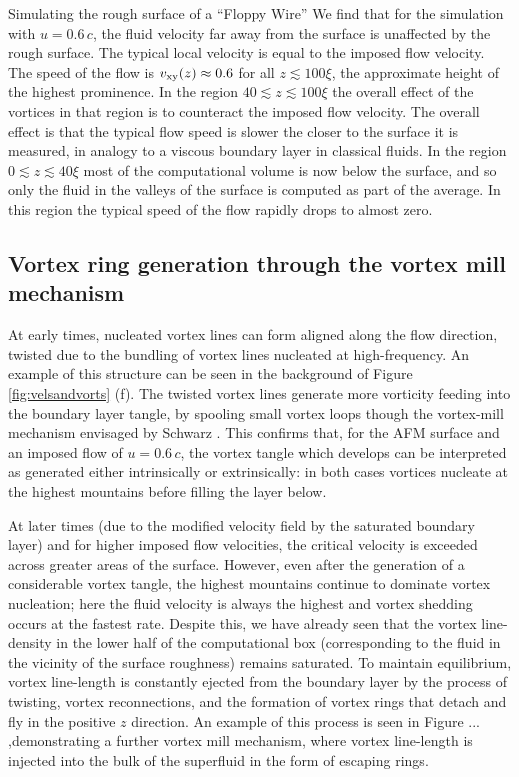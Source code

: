 \begin{chapter}{\label{cha:afm}Simulating the rough surface of a ``Floppy Wire''}
We find that for the simulation with $u=0.6\,c$, the fluid velocity far away from the surface is unaffected by the rough surface. The typical local velocity is equal to the imposed flow velocity. The speed of the flow is $v_{\rm xy}(z)\approx0.6$ for all $z \lesssim 100\xi$, the approximate height of the highest prominence. In the region $40 \lesssim z \lesssim 100\xi$ the overall effect of the vortices in that region is to counteract the imposed flow velocity. The overall effect is that the typical flow speed is slower the closer to the surface it is measured, in analogy to a viscous boundary layer in classical fluids. In the region $0 \lesssim z \lesssim 40\xi$ most of the computational volume is now below the surface, and so only the fluid in the valleys of the surface is computed as part of the average. In this region the typical speed of the flow rapidly drops to almost zero.

\subsection{\label{sec:vortexmill}Vortex ring generation through the vortex mill mechanism}
At early times, nucleated vortex lines can form aligned along the flow direction, twisted due to the bundling of vortex lines nucleated at high-frequency. An example of this structure can be seen in the background of Figure \ref{fig:velsandvorts} (f). The twisted vortex lines generate more vorticity feeding into the boundary layer tangle, by spooling small vortex loops though the vortex-mill mechanism envisaged by Schwarz \cite{PhysRevLett.64.1130}. This confirms that, for the AFM surface and an imposed flow of $u=0.6\,c$, the vortex tangle which develops can be interpreted as generated either intrinsically or extrinsically: in both cases vortices nucleate at the highest mountains before filling the layer below.

At later times (due to the modified velocity field by the saturated boundary layer) and for higher imposed flow velocities, the critical velocity is exceeded across greater areas of the surface. However, even after the generation of a considerable vortex tangle, the highest mountains continue to dominate vortex nucleation; here the fluid velocity is always the highest and vortex shedding occurs at the fastest rate. Despite this, we have already seen that the vortex line-density in the lower half of the computational box (corresponding to the fluid in the vicinity of the surface roughness) remains saturated. To maintain equilibrium, vortex line-length is constantly ejected from the boundary layer by the process of twisting, vortex reconnections, and the formation of vortex rings that detach and fly in the positive $z$ direction. An example of this process is seen in Figure ... ,demonstrating a further vortex mill mechanism, where vortex line-length is injected into the bulk of the superfluid in the form of escaping rings.


\end{chapter}
